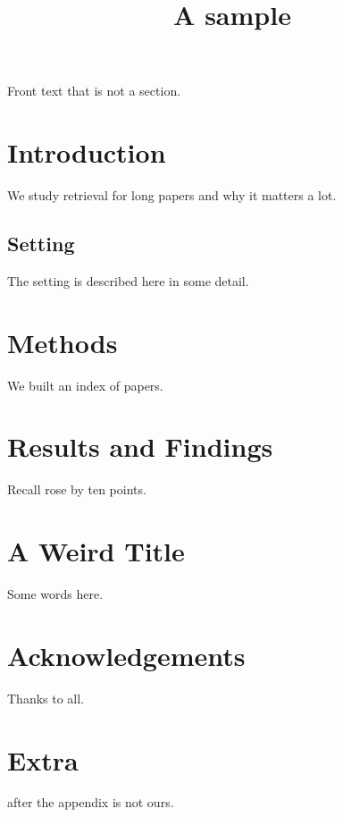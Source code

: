 \documentclass{article}
\title{A sample}
\begin{document}
\maketitle
Front text that is not a section.
\section{Introduction}
We study retrieval for long papers and why it matters a lot.
\subsection{Setting}
The setting is described here in some detail.
\section*{Methods}
We built an index of papers.
\section[Short]{Results and Findings}
Recall rose by ten points.
\section{A Weird Title}
Some words here.
\section*{Acknowledgements}
Thanks to all.
\appendix
\section{Extra} after the appendix is not ours.


\end{document}
